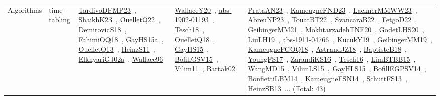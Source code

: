 {\begin{longtable}{lp{3cm}>{\raggedright\arraybackslash}p{6cm}>{\raggedright\arraybackslash}p{6cm}>{\raggedright\arraybackslash}p{8cm}}
Algorithms & time-tabling & \href{works/TardivoDFMP23.pdf}{TardivoDFMP23}~\cite{TardivoDFMP23}, \href{works/ShaikhK23.pdf}{ShaikhK23}~\cite{ShaikhK23}, \href{works/OuelletQ22.pdf}{OuelletQ22}~\cite{OuelletQ22}, \href{works/DemirovicS18.pdf}{DemirovicS18}~\cite{DemirovicS18}, \href{works/FahimiOQ18.pdf}{FahimiOQ18}~\cite{FahimiOQ18}, \href{works/GayHS15a.pdf}{GayHS15a}~\cite{GayHS15a}, \href{works/OuelletQ13.pdf}{OuelletQ13}~\cite{OuelletQ13}, \href{works/HeinzS11.pdf}{HeinzS11}~\cite{HeinzS11}, \href{works/ElkhyariGJ02a.pdf}{ElkhyariGJ02a}~\cite{ElkhyariGJ02a}, \href{works/Wallace96.pdf}{Wallace96}~\cite{Wallace96} & \href{works/WallaceY20.pdf}{WallaceY20}~\cite{WallaceY20}, \href{works/abs-1902-01193.pdf}{abs-1902-01193}~\cite{abs-1902-01193}, \href{works/Tesch18.pdf}{Tesch18}~\cite{Tesch18}, \href{works/OuelletQ18.pdf}{OuelletQ18}~\cite{OuelletQ18}, \href{works/GayHS15.pdf}{GayHS15}~\cite{GayHS15}, \href{works/BofillGSV15.pdf}{BofillGSV15}~\cite{BofillGSV15}, \href{works/Vilim11.pdf}{Vilim11}~\cite{Vilim11}, \href{works/Bartak02.pdf}{Bartak02}~\cite{Bartak02} & \href{works/PrataAN23.pdf}{PrataAN23}~\cite{PrataAN23}, \href{works/KameugneFND23.pdf}{KameugneFND23}~\cite{KameugneFND23}, \href{works/LacknerMMWW23.pdf}{LacknerMMWW23}~\cite{LacknerMMWW23}, \href{works/AbreuNP23.pdf}{AbreuNP23}~\cite{AbreuNP23}, \href{works/TouatBT22.pdf}{TouatBT22}~\cite{TouatBT22}, \href{works/SvancaraB22.pdf}{SvancaraB22}~\cite{SvancaraB22}, \href{works/FetgoD22.pdf}{FetgoD22}~\cite{FetgoD22}, \href{works/GeibingerMM21.pdf}{GeibingerMM21}~\cite{GeibingerMM21}, \href{works/MokhtarzadehTNF20.pdf}{MokhtarzadehTNF20}~\cite{MokhtarzadehTNF20}, \href{works/GodetLHS20.pdf}{GodetLHS20}~\cite{GodetLHS20}, \href{works/LiuLH19.pdf}{LiuLH19}~\cite{LiuLH19}, \href{works/abs-1911-04766.pdf}{abs-1911-04766}~\cite{abs-1911-04766}, \href{works/KucukY19.pdf}{KucukY19}~\cite{KucukY19}, \href{works/GeibingerMM19.pdf}{GeibingerMM19}~\cite{GeibingerMM19}, \href{works/KameugneFGOQ18.pdf}{KameugneFGOQ18}~\cite{KameugneFGOQ18}, \href{works/AstrandJZ18.pdf}{AstrandJZ18}~\cite{AstrandJZ18}, \href{works/BaptisteB18.pdf}{BaptisteB18}~\cite{BaptisteB18}, \href{works/YoungFS17.pdf}{YoungFS17}~\cite{YoungFS17}, \href{works/ZarandiKS16.pdf}{ZarandiKS16}~\cite{ZarandiKS16}, \href{works/Tesch16.pdf}{Tesch16}~\cite{Tesch16}, \href{works/LimBTBB15.pdf}{LimBTBB15}~\cite{LimBTBB15}, \href{works/WangMD15.pdf}{WangMD15}~\cite{WangMD15}, \href{works/VilimLS15.pdf}{VilimLS15}~\cite{VilimLS15}, \href{works/GayHLS15.pdf}{GayHLS15}~\cite{GayHLS15}, \href{works/BofillEGPSV14.pdf}{BofillEGPSV14}~\cite{BofillEGPSV14}, \href{works/BonfiettiLBM14.pdf}{BonfiettiLBM14}~\cite{BonfiettiLBM14}, \href{works/KameugneFSN14.pdf}{KameugneFSN14}~\cite{KameugneFSN14}, \href{works/SchuttFS13.pdf}{SchuttFS13}~\cite{SchuttFS13}, \href{works/HeinzSB13.pdf}{HeinzSB13}~\cite{HeinzSB13}... (Total: 43)\\
\end{longtable}
}

